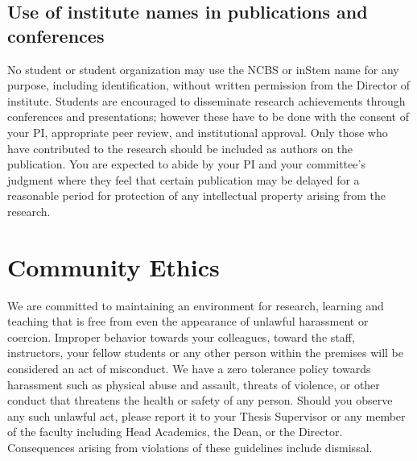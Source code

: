 \documentclass[a4paper]{extarticle}
\begin{document}
\subsection{Use of institute names in publications and conferences}
No student or student
organization may use the NCBS or inStem name for any purpose, including identification,
without written permission from the Director of institute. Students are encouraged to
disseminate research achievements through conferences and presentations; however these
have to be done with the consent of your PI, appropriate peer review, and institutional
approval. Only those who have contributed to the research should be included as authors on
the publication. You are expected to abide by your PI and your committee’s judgment where
they feel that certain publication may be delayed for a reasonable period for protection of
any intellectual property arising from the research.

\section{Community Ethics}
We are committed to maintaining an environment for research, learning and teaching that is
free from even the appearance of unlawful harassment or coercion. Improper behavior
towards your colleagues, toward the staff, instructors, your fellow students or any other
person within the premises will be considered an act of misconduct. We have a zero
tolerance policy towards harassment such as physical abuse and assault, threats of violence,
or other conduct that threatens the health or safety of any person. Should you observe any
such unlawful act, please report it to your Thesis Supervisor or any member of the faculty
including Head Academics, the Dean, or the Director. Consequences arising from violations
of these guidelines include dismissal.
\end{document}
